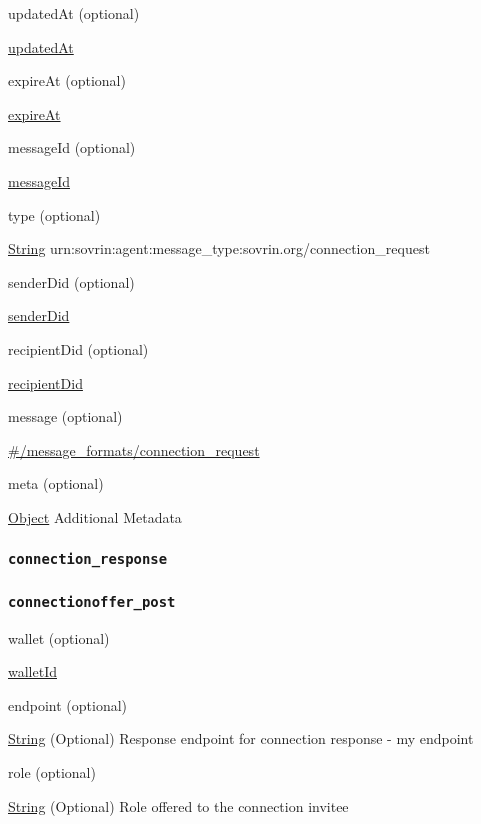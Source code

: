 updatedAt (optional)

{\protect\hyperlink{updatedAt}{updatedAt}}

expireAt (optional)

{\protect\hyperlink{expireAt}{expireAt}}

messageId (optional)

{\protect\hyperlink{messageId}{messageId}}

type (optional)

{\protect\hyperlink{string}{String}}
urn:sovrin:agent:message\_type:sovrin.org/connection\_request

senderDid (optional)

{\protect\hyperlink{senderDid}{senderDid}}

recipientDid (optional)

{\protect\hyperlink{recipientDid}{recipientDid}}

message (optional)

{\protect\hyperlink{ux5cux23ux2fmessage_formatsux2fconnection_request}{\#/message\_formats/connection\_request}}

meta (optional)

{\protect\hyperlink{object}{Object}} Additional Metadata

\hypertarget{connection_response}{%
\subsubsection{\texorpdfstring{\protect\hypertarget{connection_response}{}{\texttt{connection\_response}}}{connection\_response}}\label{connection_response}}

\hypertarget{connectionoffer_post}{%
\subsubsection{\texorpdfstring{\protect\hypertarget{connectionoffer_post}{}{\texttt{connectionoffer\_post}}}{connectionoffer\_post}}\label{connectionoffer_post}}

wallet (optional)

{\protect\hyperlink{walletId}{walletId}}

endpoint (optional)

{\protect\hyperlink{string}{String}} (Optional) Response endpoint for
connection response - my endpoint

role (optional)

{\protect\hyperlink{string}{String}} (Optional) Role offered to the
connection invitee

